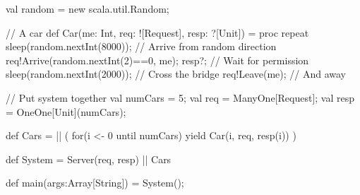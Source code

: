 \begin{answer}
\begin{scala}
{  val random = new scala.util.Random;

  // A car
  def Car(me: Int, req: ![Request], resp: ?[Unit]) = proc{
    repeat{
      sleep(random.nextInt(8000));
      // Arrive from random direction
      req!Arrive(random.nextInt(2)==0, me); 
      resp?; // Wait for permission 
      sleep(random.nextInt(2000)); // Cross the bridge
      req!Leave(me); // And away
    }
  }

  // Put system together
  val numCars = 5;
  val req = ManyOne[Request];
  val resp = OneOne[Unit](numCars);

  def Cars = 
    || ( for(i <- 0 until numCars) yield Car(i, req, resp(i)) )

  def System = Server(req, resp) || Cars

  def main(args:Array[String]) = System();
}
\end{scala}
\end{answer}

